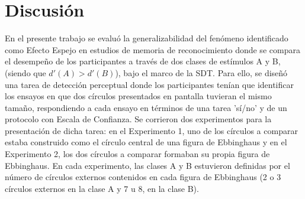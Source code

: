 
\chapter{Discusión} %

\label{Cap_Disc} %

En el presente trabajo se evaluó la generalizabilidad del fenómeno identificado como Efecto Espejo en estudios de memoria de reconocimiento donde se compara el desempeño de los participantes a través de dos clases de estímulos A y B, (siendo que $d'(A)>d'(B)$), bajo el marco de la SDT. Para ello, se diseñó una tarea de detección perceptual donde los participantes tenían que identificar los ensayos en que dos círculos presentados en pantalla tuvieran el mismo tamaño, respondiendo a cada ensayo en términos de una tarea 'sí/no' y de un protocolo con Escala de Confianza. Se corrieron dos experimentos para la presentación de dicha tarea: en el Experimento 1, uno de los círculos a comparar estaba construido como el círculo central de una figura de Ebbinghaus y en el Experimento 2, los dos círculos a comparar formaban su propia figura de Ebbinghaus. En cada experimento, las clases A y B estuvieron definidas por el número de círculos externos contenidos en cada figura de Ebbinghaus (2 o 3 círculos externos en la clase A y 7 u 8, en la clase B).\\


